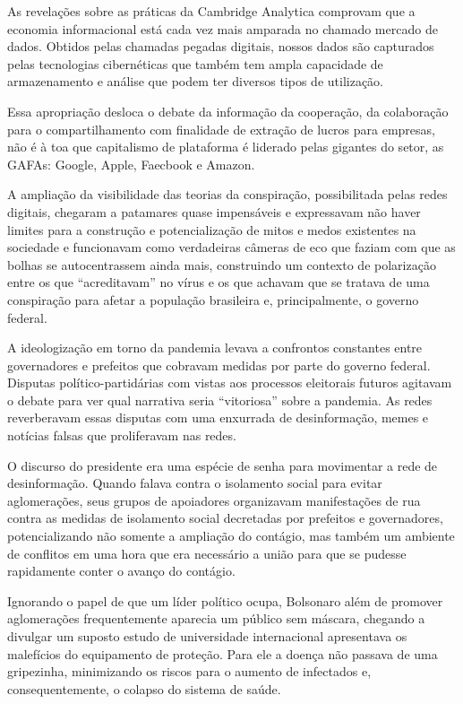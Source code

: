 As revelações sobre as práticas da Cambridge Analytica comprovam que a
economia informacional está cada vez mais amparada no chamado mercado de
dados. Obtidos pelas chamadas pegadas digitais, nossos dados são
capturados pelas tecnologias cibernéticas que também tem ampla
capacidade de armazenamento e análise que podem ter diversos tipos de
utilização.

Essa apropriação desloca o debate da informação da cooperação, da
colaboração para o compartilhamento com finalidade de extração de lucros
para empresas, não é à toa que capitalismo de plataforma é liderado
pelas gigantes do setor, as GAFAs: Google, Apple, Faecbook e Amazon.

A ampliação da visibilidade das teorias da conspiração, possibilitada
pelas redes digitais, chegaram a patamares quase impensáveis e
expressavam não haver limites para a construção e potencialização de
mitos e medos existentes na sociedade e funcionavam como verdadeiras
câmeras de eco que faziam com que as bolhas se autocentrassem ainda
mais, construindo um contexto de polarização entre os que
``acreditavam'' no vírus e os que achavam que se tratava de uma
conspiração para afetar a população brasileira e, principalmente, o
governo federal.

A ideologização em torno da pandemia levava a confrontos constantes
entre governadores e prefeitos que cobravam medidas por parte do governo
federal. Disputas político-partidárias com vistas aos processos
eleitorais futuros agitavam o debate para ver qual narrativa seria
``vitoriosa'' sobre a pandemia. As redes reverberavam essas disputas com
uma enxurrada de desinformação, memes e notícias falsas que proliferavam
nas redes.

O discurso do presidente era uma espécie de senha para movimentar a rede
de desinformação. Quando falava contra o isolamento social para evitar
aglomerações, seus grupos de apoiadores organizavam manifestações de rua
contra as medidas de isolamento social decretadas por prefeitos e
governadores, potencializando não somente a ampliação do contágio, mas
também um ambiente de conflitos em uma hora que era necessário a união
para que se pudesse rapidamente conter o avanço do contágio.

Ignorando o papel de que um líder político ocupa, Bolsonaro além de
promover aglomerações frequentemente aparecia um público sem máscara,
chegando a divulgar um suposto estudo de universidade internacional
apresentava os malefícios do equipamento de proteção. Para ele a doença
não passava de uma gripezinha, minimizando os riscos para o aumento de
infectados e, consequentemente, o colapso do sistema de saúde.

